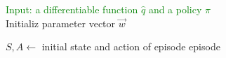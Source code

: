 \documentclass{standalone}
\begin{document}
\pagestyle{empty}
\begin{algorithm}[H]
  \textcolor{Green}{Input: a differentiable function $\hat{q}$ and a policy $\pi$}\\
  \textcolor{Cerulean}{Initializ parameter vector $\vec{w}$} \\
 {
	$S,A \leftarrow$ initial state and action of episode
	episode\\
   {}
  
}
\end{algorithm}
\end{document}
